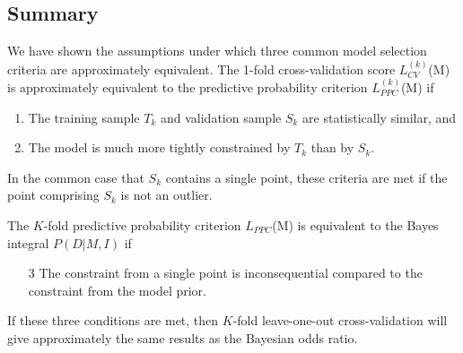 \documentclass[12pt]{article}
\newcommand{\LCVk}[1]{\ensuremath{L^{(k)}_{CV}}(#1)}
\newcommand{\LPPC}[1]{\ensuremath{L_{PPC}}(#1)}
\newcommand{\LPPCk}[1]{\ensuremath{L^{(k)}_{PPC}}(#1)}
\begin{document}
\subsection{Summary}
We have shown the assumptions under which three common model selection criteria
are approximately equivalent.  The 1-fold cross-validation score \LCVk{M}
is approximately equivalent to the predictive probability criterion
\LPPCk{M} if
\begin{enumerate}
  \item The training sample $T_k$ and validation sample $S_k$ are
    statistically similar, and
  \item The model is much more tightly constrained by $T_k$ than by $S_k$.
\end{enumerate}
In the common case that $S_k$ contains a single point, these criteria are
met if the point comprising $S_k$ is not an outlier.

The $K$-fold predictive probability criterion \LPPC{M} is equivalent to
the Bayes integral $P(D|M,I)$ if
\begin{enumerate}
  \item[3] The constraint from a single point is inconsequential compared
    to the constraint from the model prior.
\end{enumerate}
If these three conditions are met, then $K$-fold leave-one-out cross-validation
will give approximately the same results as the Bayesian odds ratio.
\end{document}
